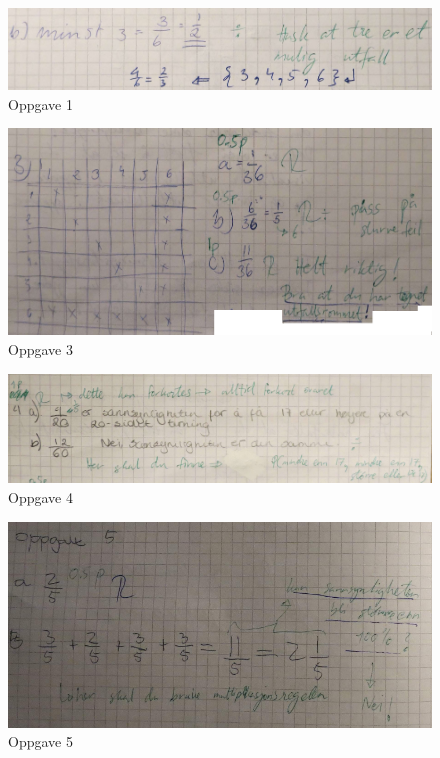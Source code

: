 \documentclass[main.tex]{subfiles}
\begin{document}
\begin{figure}
\centering
\includegraphics[scale = 0.4]{../figures/maryam.png}
\caption{Oppgave 1}
\label{fig:maryam}
\end{figure}

\begin{figure}
\centering
\includegraphics[scale = 0.4]{../figures/maryam2.png}
\caption{Oppgave 3}
\label{fig:maryam2}
\end{figure}

\begin{figure}
\centering
\includegraphics[scale = 0.4]{../figures/maria.png}
\caption{Oppgave 4}
\label{fig:maria}
\end{figure}

\begin{figure}
\centering
\includegraphics[scale = 0.4]{../figures/mohsin.png}
\caption{Oppgave 5}
\label{fig:mohsin}
\end{figure}
\end{document}
